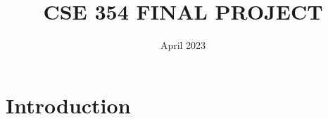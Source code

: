 \documentclass{article}
\title{CSE 354 FINAL PROJECT}
\author{}
\date{April 2023}
\begin{document}
\maketitle

\section{Introduction}
\end{document}
